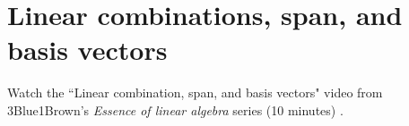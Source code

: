 \section{Linear combinations, span, and basis vectors}

Watch the ``Linear combination, span, and basis vectors" video from
3Blue1Brown's \textit{Essence of linear algebra} series (10 minutes)
\cite{bib:linalg_linear_combinations}.
